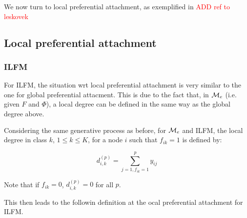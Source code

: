 We now turn to local preferential attachment, as exemplified in \textcolor{red}{ADD ref to leskovek}


\subsection{Local preferential attachment}

\subsubsection{ILFM}

For ILFM, the situation wrt local preferential attachment is very similar to the one for global preferential attacment.
This is due to the fact that, in $\mathcal{M}_e$ (i.e. given $F$ and $\Phi$), a local degree can be defined in the same way as the global degree above.

Considering the same generative process as before, for $\mathcal{M}_e$ and ILFM, the local degree in class $k$, $1\leq k\leq K$, for a node $i$ such that $f_{ik}=1$ is defined by:

\begin{equation*}
d_{i,k}^{(p)} = \sum_{j=1, f_{ik}=1}^p y_{ij}
\end{equation*}

Note that if $f_{ik}=0$, $d_{i,k}^{(p)} = 0$ for all $p$.

This then leads to the followin definition at the ocal preferential attachment for ILFM.

